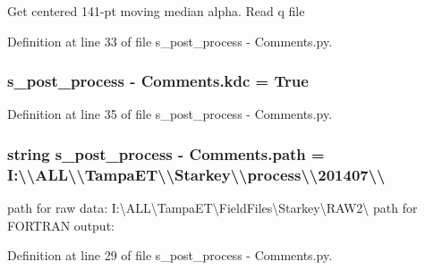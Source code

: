 Get centered 141-\/pt moving median alpha. Read q file 

Definition at line 33 of file s\+\_\+post\+\_\+process -\/ Comments.\+py.

\hypertarget{namespaces__post__process_01-_01_comments_a9ad05e10331e51befb7fbd20adefb30e}{}
\subsubsection[{kdc}]{\setlength{\rightskip}{0pt plus 5cm}s\+\_\+post\+\_\+process -\/ Comments.\+kdc = True}\label{namespaces__post__process_01-_01_comments_a9ad05e10331e51befb7fbd20adefb30e}


Definition at line 35 of file s\+\_\+post\+\_\+process -\/ Comments.\+py.

\hypertarget{namespaces__post__process_01-_01_comments_a443ac998e99f88439a5522c68a86609f}{}
\subsubsection[{path}]{\setlength{\rightskip}{0pt plus 5cm}string s\+\_\+post\+\_\+process -\/ Comments.\+path = \textquotesingle{}I\+:\textbackslash{}\textbackslash{}\+A\+L\+L\textbackslash{}\textbackslash{}\+Tampa\+E\+T\textbackslash{}\textbackslash{}\+Starkey\textbackslash{}\textbackslash{}process\textbackslash{}\textbackslash{}201407\textbackslash{}\textbackslash{}\textquotesingle{}}\label{namespaces__post__process_01-_01_comments_a443ac998e99f88439a5522c68a86609f}


path for raw data\+: \textquotesingle{}I\+:\textbackslash{}A\+L\+L\textbackslash{}Tampa\+E\+T\textbackslash{}Field\+Files\textbackslash{}Starkey\textbackslash{}R\+A\+W2\textbackslash{}\textquotesingle{} path for F\+O\+R\+T\+R\+A\+N output\+: 



Definition at line 29 of file s\+\_\+post\+\_\+process -\/ Comments.\+py.

\hypertarget{namespaces__post__process_01-_01_comments_a44e382ad617792a5ed02be95da593433}{}

